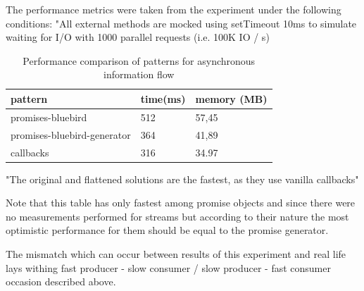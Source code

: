  The performance metrics were taken from the experiment under the following conditions: "All external methods are mocked using setTimeout 10ms to simulate waiting for I/O with 1000 parallel requests (i.e. 100K IO / s) \cite{asyncPerformance_2}

\begin{table}[h]
	\begin{center}
		\begin{tabular}{| l | l | l | }
			\hline
			\textbf{pattern} & \textbf{time(ms)} & \textbf{memory (MB)} \\
			\hline
			promises-bluebird & 512 & 57,45 \\
			\hline
			promises-bluebird-generator & 364 & 41,89 \\
			\hline
			callbacks & 316 & 34.97 \\
			\hline
		\end{tabular}
	\end{center}
	\caption{Performance comparison of patterns for asynchronous information flow \cite{asyncPerformance_2}\cite{asyncPerformance}}
\end{table}


"The original and flattened solutions are the fastest, as they use vanilla callbacks"\cite{asyncPerformance}

Note that this table has only fastest among promise objects and since there were no measurements performed for streams but according to their nature the most optimistic performance for them should be equal to the promise generator.

The mismatch which can occur between results of this experiment and real life lays withing fast producer - slow consumer / slow producer - fast consumer occasion described above.



